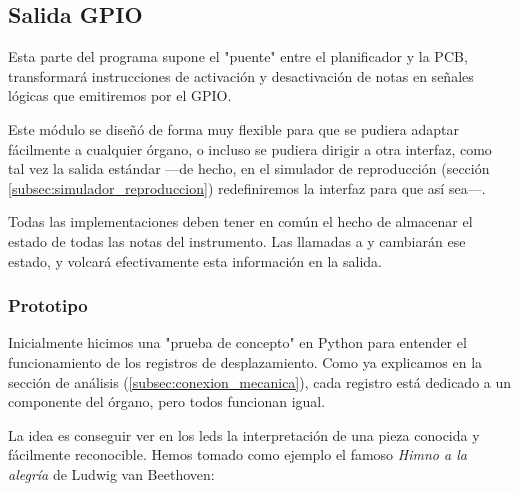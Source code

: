 \subsection{Salida GPIO}

Esta parte del programa supone el "puente" entre el planificador y la \acrshort{PCB}, transformará instrucciones de activación y desactivación de notas en señales lógicas que emitiremos por el \acrshort{GPIO}. 

Este módulo se diseñó de forma muy flexible para que se pudiera adaptar fácilmente a cualquier órgano, o incluso se pudiera dirigir a otra interfaz, como tal vez la salida estándar ---de hecho, en el simulador de reproducción (sección \ref{subsec:simulador_reproduccion}) redefiniremos la interfaz para que así sea---.

Todas las implementaciones deben tener en común el hecho de almacenar el estado de todas las notas del instrumento. Las llamadas a  y  cambiarán ese estado, y  volcará efectivamente esta información en la salida.

\subsubsection{Prototipo}

Inicialmente hicimos una "prueba de concepto" en Python para entender el funcionamiento de los registros de desplazamiento. Como ya explicamos en la sección de análisis (\ref{subsec:conexion_mecanica}), cada registro está dedicado a un componente del órgano, pero todos funcionan igual.

La idea es conseguir ver en los \acrshort{led}s la interpretación de una pieza conocida y fácilmente reconocible. Hemos tomado como ejemplo el famoso \textit{Himno a la alegría} de Ludwig van Beethoven:

\smallskip

